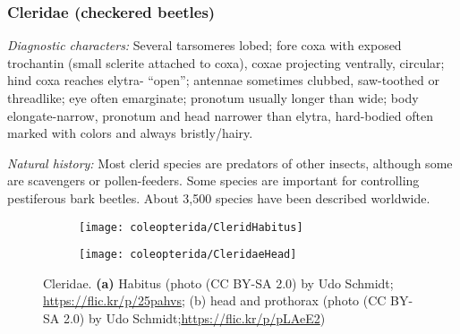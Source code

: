 \subsubsection{Cleridae (checkered beetles)}
\noindent{}\textit{Diagnostic characters:} Several tarsomeres lobed; fore coxa with exposed trochantin (small sclerite attached to coxa), coxae projecting ventrally, circular; hind coxa reaches elytra- ``open''; antennae sometimes clubbed, saw-toothed or threadlike; eye often emarginate; pronotum usually longer than wide; body elongate-narrow, pronotum and head narrower than elytra, hard-bodied often marked with colors and always bristly/hairy.\vspace{3mm}

\noindent{}\textit{Natural history:} Most clerid species are predators of other insects, although some are scavengers or pollen-feeders. Some species are important for controlling pestiferous bark beetles. About 3,500 species have been described worldwide.

\begin{figure}[ht!]
  \centering
\begin{subfigure}[ht!]{0.45\textwidth}
    \texttt{[image: coleopterida/CleridHabitus]}
  \caption{}
\end{subfigure}
\hfill
\begin{subfigure}[ht!]{0.4\textwidth}
    \texttt{[image: coleopterida/CleridaeHead]}
  \caption{}
  \end{subfigure}
    \caption{Cleridae. \textbf{(a)} Habitus (photo (CC BY-SA 2.0) by Udo Schmidt; \url{https://flic.kr/p/25pahvs}; (b) head and prothorax (photo (CC BY-SA 2.0) by Udo Schmidt;\url{https://flic.kr/p/pLAeE2})}\label{fig:clerid}
\end{figure}